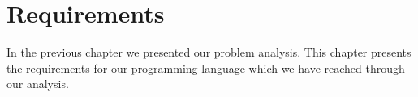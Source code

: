 \chapter{Requirements}
\label{chap:requirements}
In the previous chapter we presented our problem analysis. This chapter presents the requirements for our programming language which we have reached through our analysis.

